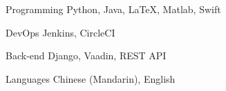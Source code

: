 

\begin{cvskills}

  \cvskill
    {Programming} %
    {Python,  Java,  LaTeX,  Matlab,  Swift} %

  \cvskill
    {DevOps} %
    {Jenkins, CircleCI} %

  \cvskill
    {Back-end} %
    {Django,  Vaadin,  REST API} %

  \cvskill
    {Languages} %
    {Chinese (Mandarin),  English} %

\end{cvskills}
